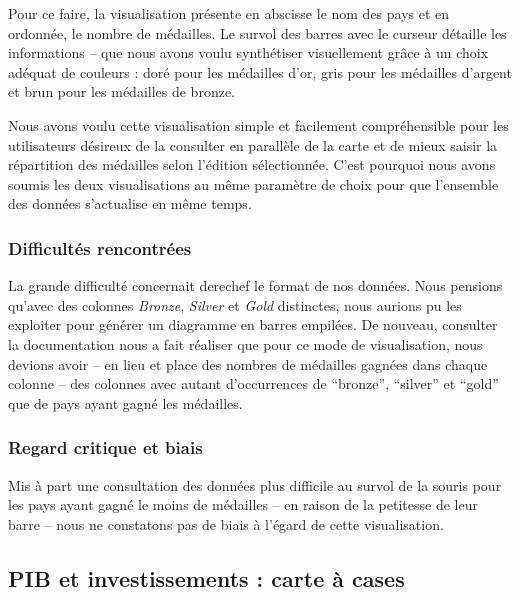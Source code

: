 \documentclass[hidelinks, 12pt]{report}
\begin{document}
Pour ce faire, la visualisation présente en abscisse le nom des pays et en ordonnée, le nombre de médailles. Le survol des barres avec le curseur détaille les informations -- que nous avons voulu synthétiser visuellement grâce à un choix adéquat de couleurs : doré pour les médailles d'or, gris pour les médailles d'argent et brun pour les médailles de bronze.

Nous avons voulu cette visualisation simple et facilement compréhensible pour les utilisateurs désireux de la consulter en parallèle de la carte et de mieux saisir la répartition des médailles selon l'édition sélectionnée. C'est pourquoi nous avons soumis les deux visualisations au même paramètre de choix pour que l'ensemble des données s'actualise en même temps.

\subsubsection{Difficultés rencontrées}

La grande difficulté concernait derechef le format de nos données. Nous pensions qu'avec des colonnes \textit{Bronze}, \textit{Silver} et \textit{Gold} distinctes, nous aurions pu les exploiter pour générer un diagramme en barres empilées. De nouveau, consulter la documentation nous a fait réaliser que pour ce mode de visualisation, nous devions avoir -- en lieu et place des nombres de médailles gagnées dans chaque colonne -- des colonnes avec autant d'occurrences de \enquote{bronze}, \enquote{silver} et \enquote{gold} que de pays ayant gagné les médailles.

\subsubsection{Regard critique et biais}

Mis à part une consultation des données plus difficile au survol de la souris pour les pays ayant gagné le moins de médailles -- en raison de la petitesse de leur barre -- nous ne constatons pas de biais à l'égard de cette visualisation. 





%





\subsection{PIB et investissements : carte à cases}
\end{document}
